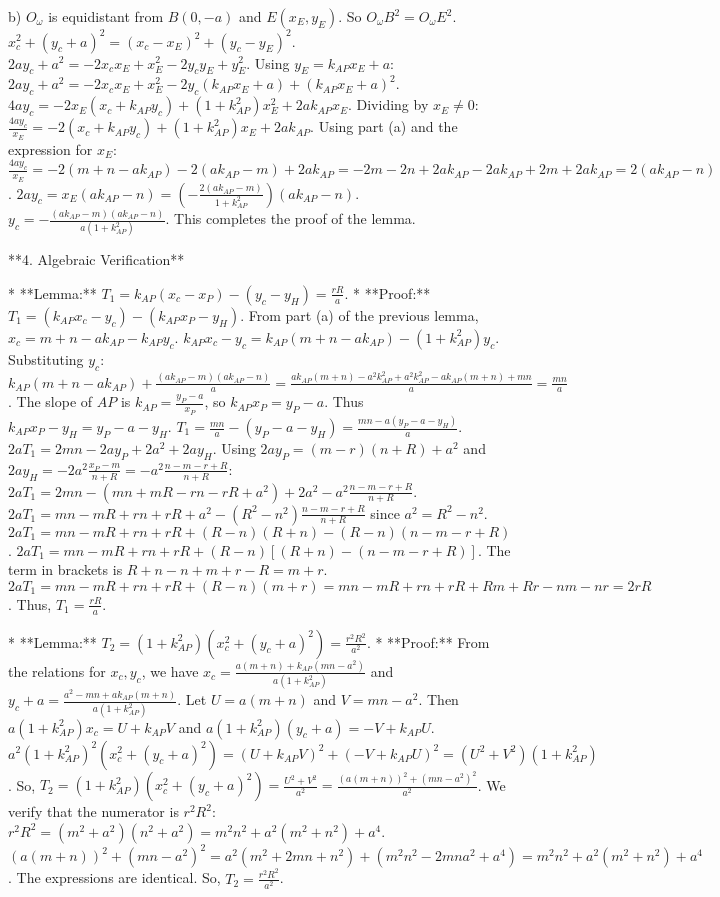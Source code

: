     b) $O_\omega$ is equidistant from $B(0,-a)$ and $E(x_E, y_E)$. So $O_\omega B^2 = O_\omega E^2$.
    $x_c^2+(y_c+a)^2 = (x_c-x_E)^2+(y_c-y_E)^2$.
    $2ay_c + a^2 = -2x_cx_E + x_E^2 - 2y_cy_E + y_E^2$.
    Using $y_E=k_{AP}x_E+a$:
    $2ay_c + a^2 = -2x_cx_E + x_E^2 - 2y_c(k_{AP}x_E+a) + (k_{AP}x_E+a)^2$.
    $4ay_c = -2x_E(x_c+k_{AP}y_c) + (1+k_{AP}^2)x_E^2 + 2ak_{AP}x_E$.
    Dividing by $x_E \neq 0$: $\frac{4ay_c}{x_E} = -2(x_c+k_{AP}y_c) + (1+k_{AP}^2)x_E + 2ak_{AP}$.
    Using part (a) and the expression for $x_E$:
    $\frac{4ay_c}{x_E} = -2(m+n-ak_{AP}) -2(ak_{AP}-m) + 2ak_{AP} = -2m-2n+2ak_{AP} -2ak_{AP}+2m + 2ak_{AP} = 2(ak_{AP}-n)$.
    $2ay_c = x_E(ak_{AP}-n) = \left(-\frac{2(ak_{AP}-m)}{1+k_{AP}^2}\right)(ak_{AP}-n)$.
    $y_c = -\frac{(ak_{AP}-m)(ak_{AP}-n)}{a(1+k_{AP}^2)}$. This completes the proof of the lemma.

**4. Algebraic Verification**

*   **Lemma:** $T_1 = k_{AP}(x_c-x_P) - (y_c-y_H) = \frac{rR}{a}$.
*   **Proof:** $T_1 = (k_{AP}x_c-y_c) - (k_{AP}x_P-y_H)$.
    From part (a) of the previous lemma, $x_c = m+n-ak_{AP}-k_{AP}y_c$.
    $k_{AP}x_c-y_c = k_{AP}(m+n-ak_{AP})-(1+k_{AP}^2)y_c$. Substituting $y_c$:
    $k_{AP}(m+n-ak_{AP}) + \frac{(ak_{AP}-m)(ak_{AP}-n)}{a} = \frac{ak_{AP}(m+n)-a^2k_{AP}^2+a^2k_{AP}^2-ak_{AP}(m+n)+mn}{a} = \frac{mn}{a}$.
    The slope of $AP$ is $k_{AP} = \frac{y_P-a}{x_P}$, so $k_{AP}x_P = y_P-a$. Thus $k_{AP}x_P-y_H = y_P-a-y_H$.
    $T_1 = \frac{mn}{a} - (y_P-a-y_H) = \frac{mn - a(y_P-a-y_H)}{a}$.
    $2aT_1 = 2mn - 2ay_P + 2a^2 + 2ay_H$.
    Using $2ay_P = (m-r)(n+R)+a^2$ and $2ay_H = -2a^2\frac{x_P-m}{n+R} = -a^2\frac{n-m-r+R}{n+R}$:
    $2aT_1 = 2mn - (mn+mR-rn-rR+a^2) + 2a^2 - a^2\frac{n-m-r+R}{n+R}$.
    $2aT_1 = mn - mR + rn + rR + a^2 - (R^2-n^2)\frac{n-m-r+R}{n+R}$ since $a^2=R^2-n^2$.
    $2aT_1 = mn - mR + rn + rR + (R-n)(R+n) - (R-n)(n-m-r+R)$.
    $2aT_1 = mn - mR + rn + rR + (R-n)[(R+n)-(n-m-r+R)]$.
    The term in brackets is $R+n-n+m+r-R = m+r$.
    $2aT_1 = mn - mR + rn + rR + (R-n)(m+r) = mn - mR + rn + rR + Rm + Rr - nm - nr = 2rR$.
    Thus, $T_1 = \frac{rR}{a}$.

*   **Lemma:** $T_2 = (1+k_{AP}^2)(x_c^2 + (y_c+a)^2) = \frac{r^2R^2}{a^2}$.
*   **Proof:** From the relations for $x_c, y_c$, we have $x_c = \frac{a(m+n)+k_{AP}(mn-a^2)}{a(1+k_{AP}^2)}$ and $y_c+a = \frac{a^2-mn+ak_{AP}(m+n)}{a(1+k_{AP}^2)}$.
    Let $U=a(m+n)$ and $V=mn-a^2$. Then $a(1+k_{AP}^2)x_c = U+k_{AP}V$ and $a(1+k_{AP}^2)(y_c+a) = -V+k_{AP}U$.
    $a^2(1+k_{AP}^2)^2(x_c^2+(y_c+a)^2) = (U+k_{AP}V)^2 + (-V+k_{AP}U)^2 = (U^2+V^2)(1+k_{AP}^2)$.
    So, $T_2 = (1+k_{AP}^2)(x_c^2+(y_c+a)^2) = \frac{U^2+V^2}{a^2} = \frac{(a(m+n))^2+(mn-a^2)^2}{a^2}$.
    We verify that the numerator is $r^2R^2$:
    $r^2R^2 = (m^2+a^2)(n^2+a^2) = m^2n^2+a^2(m^2+n^2)+a^4$.
    $(a(m+n))^2+(mn-a^2)^2 = a^2(m^2+2mn+n^2) + (m^2n^2-2mna^2+a^4) = m^2n^2+a^2(m^2+n^2)+a^4$.
    The expressions are identical. So, $T_2 = \frac{r^2R^2}{a^2}$.

